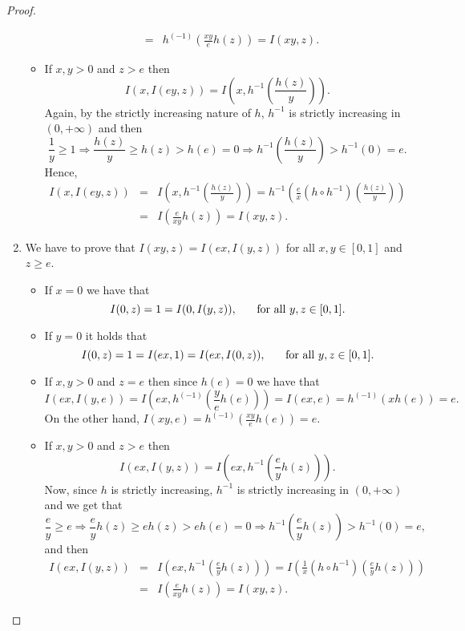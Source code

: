 \begin{proof}
\begin{enumerate}[label=(\roman*)]
\begin{itemize}
\begin{eqnarray*}
			&=& h^{(-1)} \left( \frac{xy}{e}h(z)\right) = I(xy,z).
			\end{eqnarray*}
			\item If $x,y>0$ and $z>e$ then
			$$I(x,I(ey,z))=I\left(x,h^{-1}\left(\frac{h(z)}{y}\right)\right).$$
			Again, by the strictly increasing nature of $h$, $h^{-1}$ is strictly increasing in $(0,+\infty)$ and then
			$$ \frac{1}{y} \geq 1 \Rightarrow \frac{h(z)}{y} \geq h(z) > h(e)=0 \Rightarrow h^{-1} \left( \frac{h(z)}{y}\right) > h^{-1}(0)=e.$$
			Hence,
			\begin{eqnarray*}
			I(x,I(ey,z))&=&I\left(x,h^{-1}\left(\frac{h(z)}{y}\right)\right) = h^{-1}\left(\frac{e}{x}(h \circ h^{-1})\left(\frac{h(z)}{y}\right)\right)\\
			&=&I\left(\frac{e}{xy}h(z)\right)=I(xy,z).
			\end{eqnarray*}
		\end{itemize}
		\item We have to prove that $I(xy,z)=I(ex,I(y,z))$ for all $x,y\in [0,1]$ and $z\geq e$.
		\begin{itemize}
			\item If $x=0$ we have that
			$$I(0,z)=1=I(0,I(y,z)), \hspace{0.5cm} \text{ for all } y,z \in [0,1].$$
			\item If $y=0$ it holds that
			$$I(0,z)=1=I(ex,1)=I(ex,I(0,z)), \hspace{0.5cm} \text{ for all } y,z \in [0,1].$$
			\item If $x,y>0$ and $z=e$ then since $h(e)=0$ we have that
			$$I(ex,I(y,e))=I\left(ex,h^{(-1)}\left(\frac{y}{e}h(e)\right)\right) = I(ex,e)=h^{(-1)}(xh(e))=e.$$
			On the other hand, $I(xy,e)=h^{(-1)}\left(\frac{xy}{e}h(e)\right)=e$.
			\item If $x,y>0$ and $z>e$ then
			$$I(ex,I(y,z)) = I\left(ex, h^{-1} \left(\frac{e}{y}h(z)\right)\right).$$
			Now, since $h$ is strictly increasing, $h^{-1}$ is strictly increasing in $(0,+\infty)$ and we get that
			$$\frac{e}{y} \geq e \Rightarrow \frac{e}{y}h(z) \geq eh(z) > eh(e) =0 \Rightarrow h^{-1}\left(\frac{e}{y}h(z)\right) > h^{-1}(0)=e,$$
			and then
			\begin{eqnarray*}
			I(ex,I(y,z)) &=& I\left(ex, h^{-1} \left(\frac{e}{y}h(z)\right)\right) = I\left(\frac{1}{x}(h \circ h^{-1})\left(\frac{e}{y}h(z)\right)\right) \\
			&=& I\left(\frac{e}{xy}h(z)\right)=I(xy,z).
			\end{eqnarray*}
		\end{itemize}

\end{enumerate}
\end{proof}

